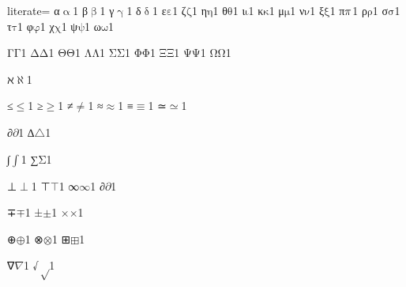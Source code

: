 {%
literate=
	{α}{{\ensuremath{\mathrm{\upalpha}}}}1
{β}{{\ensuremath{\mathrm{\upbeta}}}}1
{γ}{{\ensuremath{\mathrm{\upgamma}}}}1
{δ}{{\ensuremath{\mathrm{\updelta}}}}1
{ε}{{\ensuremath{\mathrm{\varepsilon}}}}1
{ζ}{{\ensuremath{\mathrm{\zeta}}}}1
{η}{{\ensuremath{\mathrm{\eta}}}}1
{θ}{{\ensuremath{\mathrm{\theta}}}}1
{ι}{{\ensuremath{\mathrm{\iota}}}}1
{κ}{{\ensuremath{\mathrm{\kappa}}}}1
{μ}{{\ensuremath{\mathrm{\mu}}}}1
{ν}{{\ensuremath{\mathrm{\nu}}}}1
{ξ}{{\ensuremath{\mathrm{\xi}}}}1
{π}{{\ensuremath{\mathrm{\mathnormal{\pi}}}}}1
{ρ}{{\ensuremath{\mathrm{\rho}}}}1
{σ}{{\ensuremath{\mathrm{\sigma}}}}1
{τ}{{\ensuremath{\mathrm{\tau}}}}1
{φ}{{\ensuremath{\mathrm{\varphi}}}}1
{χ}{{\ensuremath{\mathrm{\chi}}}}1
{ψ}{{\ensuremath{\mathrm{\psi}}}}1
{ω}{{\ensuremath{\mathrm{\omega}}}}1

{Γ}{{\ensuremath{\mathrm{\Gamma}}}}1
{Δ}{{\ensuremath{\mathrm{\Delta}}}}1
{Θ}{{\ensuremath{\mathrm{\Theta}}}}1
{Λ}{{\ensuremath{\mathrm{\Lambda}}}}1
{Σ}{{\ensuremath{\mathrm{\Sigma}}}}1
{Φ}{{\ensuremath{\mathrm{\Phi}}}}1
{Ξ}{{\ensuremath{\mathrm{\Xi}}}}1
{Ψ}{{\ensuremath{\mathrm{\Psi}}}}1
{Ω}{{\ensuremath{\mathrm{\Omega}}}}1

{ℵ}{{\ensuremath{\aleph}}}1

{≤}{{\color{symbolcolor}\ensuremath{\leq}}}1
{≥}{{\color{symbolcolor}\ensuremath{\geq}}}1
{≠}{{\color{symbolcolor}\ensuremath{\neq}}}1
{≈}{{\color{symbolcolor}\ensuremath{\approx}}}1
{≡}{{\color{symbolcolor}\ensuremath{\equiv}}}1
{≃}{{\color{symbolcolor}\ensuremath{\simeq}}}1

{∂}{{\color{symbolcolor}\ensuremath{\partial}}}1
{∆}{{\color{symbolcolor}\ensuremath{\triangle}}}1 %

{∫}{{\color{symbolcolor}\ensuremath{\int}}}1
{∑}{{\color{symbolcolor}\ensuremath{\mathrm{\Sigma}}}}1

{⊥}{{\color{symbolcolor}\ensuremath{\perp}}}1
{⊤}{{\color{symbolcolor}\ensuremath{\top}}}1
{∞}{{\color{symbolcolor}\ensuremath{\infty}}}1
{∂}{{\color{symbolcolor}\ensuremath{\partial}}}1

{∓}{{\color{symbolcolor}\ensuremath{\mp}}}1
{±}{{\color{symbolcolor}\ensuremath{\pm}}}1
{×}{{\color{symbolcolor}\ensuremath{\times}}}1

{⊕}{{\color{symbolcolor}\ensuremath{\oplus}}}1
{⊗}{{\color{symbolcolor}\ensuremath{\otimes}}}1
{⊞}{{\color{symbolcolor}\ensuremath{\boxplus}}}1

{∇}{{\color{symbolcolor}\ensuremath{\nabla}}}1
{√}{{\color{symbolcolor}\ensuremath{\sqrt}}}1

}
